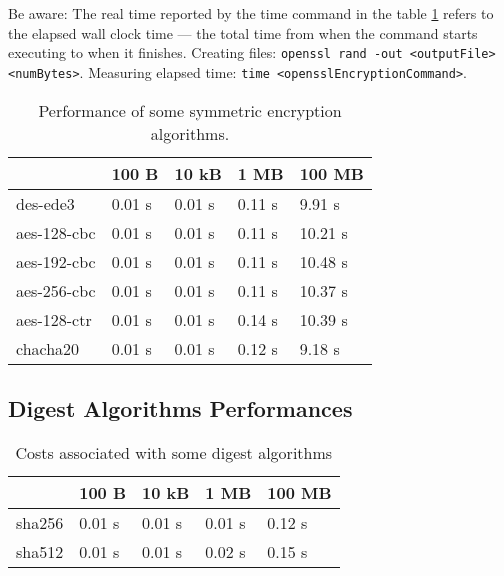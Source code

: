 Be aware: The real time reported by the time command in the table \ref{tab:symmPerformance} refers to the elapsed wall clock time — the total time from when the command starts executing to when it finishes.
\newline Creating files: \texttt{openssl rand -out <outputFile> <numBytes>}.
\newline Measuring elapsed time: \texttt{time <opensslEncryptionCommand>}.
\begin{table}[H]
		\centering
		\begin{tabular}{|p{3cm}|p{2cm}|p{2cm}|p{2cm}|p{2cm}|}\hline
	\rowcolor{blue!10}
	& 100 B & 10 kB & 1 MB & 100 MB \\ \hline
		des-ede3
			& 0.01 s
			& 0.01 s
			& 0.11 s
			& 9.91 s
			\\ \hline
		
		aes-128-cbc
			& 0.01 s
			& 0.01 s
			& 0.11 s
			& 10.21 s
			\\ \hline

		aes-192-cbc
			& 0.01 s
			& 0.01 s
			& 0.11 s
			& 10.48 s
			\\ \hline
		
		aes-256-cbc
			& 0.01 s
			& 0.01 s
			& 0.11 s
			& 10.37 s
			\\ \hline

		aes-128-ctr
			& 0.01 s
			& 0.01 s
			& 0.14 s
			& 10.39 s
			\\ \hline

		chacha20
			& 0.01 s
			& 0.01 s
			& 0.12 s
			& 9.18 s
			\\ \hline

	\end{tabular}
	\caption{Performance of some symmetric encryption algorithms.}
	\label{tab:symmPerformance}
\end{table}

\subsection*{Digest Algorithms Performances}
\begin{table}[H]
	\centering
	\begin{tabular}{|p{3cm}|p{2cm}|p{2cm}|p{2cm}|p{2cm}|}\hline
	\rowcolor{blue!10}
	& 100 B & 10 kB & 1 MB & 100 MB \\ \hline
	sha256
		&  0.01 s
		&  0.01 s
		&  0.01 s
		&  0.12 s
		\\ \hline
	
	sha512
		&  0.01 s
		&  0.01 s
		&  0.02 s
		&  0.15 s
		\\ \hline

\end{tabular}
\caption{Costs associated with some digest algorithms}
\label{tab:digestAlgorithms}
\end{table}


